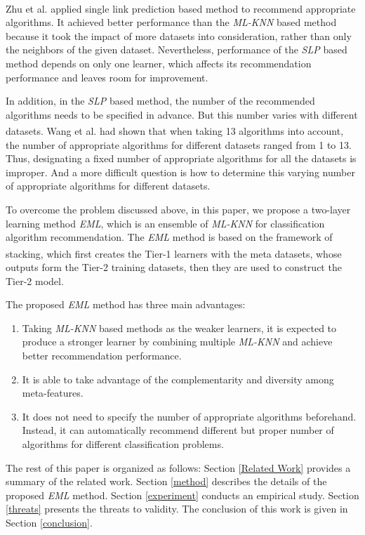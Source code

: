 \documentclass[review,3p,twocolumn,times]{elsarticle}
\newcommand{\upcite}[1]{\textsuperscript{\cite{#1}}}
\begin{document}
Zhu et al.\upcite{Zhu2018A} applied single link prediction based method to recommend appropriate algorithms. It achieved better performance than the \emph{ML-KNN} based method because it took the impact of more datasets into consideration, rather than only the neighbors of the given dataset. Nevertheless, performance of the \emph{SLP} based method depends on only one learner, which affects its recommendation performance and leaves room for improvement.

In addition, in the \emph{SLP} based method, the number of the recommended algorithms needs to be specified in advance. But this number varies with different datasets. Wang et al.\upcite{Wang2014A} had shown that when taking 13 algorithms into account, the number of appropriate algorithms for different datasets ranged from 1 to 13. Thus, designating a fixed number of appropriate algorithms for all the datasets is improper. And a more difficult question is how to determine this varying number of appropriate algorithms for different datasets. 

To overcome the problem discussed above, in this paper, we propose a two-layer learning method \emph{EML}, which is an ensemble of \emph{ML-KNN} for classification algorithm recommendation. The \emph{EML} method is based on the framework of stacking\upcite{Breiman1996Stacked}, which first creates the Tier-1 learners with the meta datasets, whose outputs form the Tier-2 training datasets, then they are used to construct the Tier-2 model. 

The proposed \emph{EML} method has three main advantages:
\begin{enumerate}[(1)]
	\item Taking \emph{ML-KNN} based methods as the weaker learners, it is expected to produce a stronger learner by combining multiple \emph{ML-KNN} and achieve better recommendation performance.
	
	\item It is able to take advantage of the complementarity and diversity among meta-features.
	
	\item It does not need to specify the number of appropriate algorithms beforehand. Instead, it can automatically recommend different but proper number of algorithms for different classification problems.
\end{enumerate}

The rest of this paper is organized as follows: Section \ref{Related Work} provides a summary of the related work. Section \ref{method} describes the details of the proposed \emph{EML} method. Section \ref{experiment} conducts an empirical study. Section \ref{threats} presents the threats to validity. The conclusion of this work is given in Section \ref{conclusion}.
\end{document}

